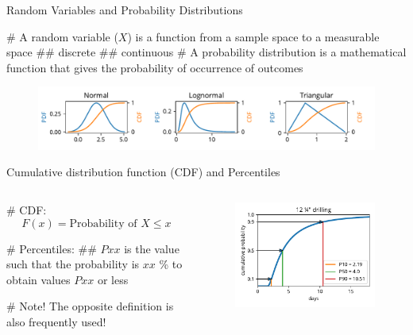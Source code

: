 \documentclass[12pt, aspectratio=149]{beamer}
\theoremstyle{plain}
\begin{document}
\begin{frame}[fragile]{Random Variables and Probability Distributions}

	\begin{easylist}[itemize]
		# A random variable ($X$) is a function from a sample space to a measurable space 
		## discrete
		## continuous
		# A probability distribution is a mathematical function that gives the probability of occurrence of outcomes
	\end{easylist}

	\begin{figure}
		\centering
		\includegraphics[width=0.99\linewidth]{figures/pdfs_cdfs}
	\end{figure}
\end{frame}


\begin{frame}[fragile]{Cumulative distribution function (CDF) and Percentiles}
\begin{columns}
	\begin{column}{0.5\textwidth}
		\begin{easylist}[itemize]
			# CDF:
			\begin{equation*}
				F(x) = \text{Probability of $X \leq x$}
			\end{equation*}
		
			# Percentiles:
			##  $Pxx$ is the value such that the probability is $xx$ \% to obtain values $Pxx$ or less

			# Note! The opposite definition is also frequently used!
		\end{easylist}
	\end{column}

	\begin{column}{0.5\textwidth}
		\begin{figure}
			\centering
			\includegraphics[width=0.99\linewidth]{figures/lognorm_cdf}
		\end{figure}
	\end{column}
\end{columns}
\end{frame}
\end{document}
